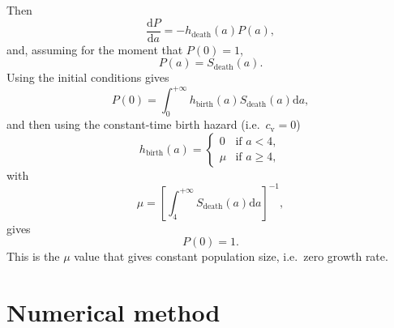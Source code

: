 \documentclass[12pt]{article}
\newcommand{\md}{\mathrm{d}}
\begin{document}
Then
\begin{equation}
  \frac{\md P}{\md a}
  = - h_{\text{death}}(a) P(a),
\end{equation}
and, assuming for the moment that $P(0) = 1$,
\begin{equation}
  P(a) = S_{\text{death}}(a).
\end{equation}
Using the initial conditions gives
\begin{equation}
  P(0) =
  \int_0^{+\infty} h_{\text{birth}}(a) S_{\text{death}}(a) \md a,
\end{equation}
and then using the constant-time birth hazard
(i.e.~$c_{\mathrm{v}} = 0$)
\begin{equation}
  h_{\text{birth}}(a) =
  \begin{cases}
    0 & \text{if $a < 4$}, \\
    \mu & \text{if $a \geq 4$},
  \end{cases}
\end{equation}
with
\begin{equation}
  \mu =
  \left[
    \int_4^{+\infty} S_{\text{death}}(a) \md a
  \right]^{-1},
\end{equation}
gives
\begin{equation}
  P(0) = 1.
\end{equation}
This is the $\mu$ value that gives constant population size,
i.e.~zero growth rate.


\section{Numerical method}
\end{document}
